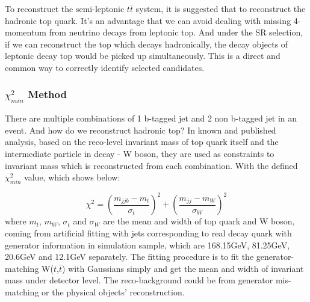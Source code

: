 		To reconstruct the semi-leptonic $t\bar{t}$ system, it is suggested that to reconstruct the hadronic top quark. It's an advantage that we can avoid dealing with missing 4-momentum from neutrino decays from leptonic top. And under the SR selection, if we can reconstruct the top which decays hadronically, the decay objects of leptonic decay top would be picked up simultaneously. This is a direct and common way to correctly identify selected candidates.

		\subsubsection{$\chi^2_{min}$ Method}
		\label{sssec:minchi2_intro} 

			There are multiple combinations of 1 b-tagged jet and 2 non b-tagged jet in an event. And how do we reconstruct hadronic top? In known and published analysis, based on the reco-level invariant mass of top quark itself and the intermediate particle in decay - W boson, they are used as constraints to invariant mass which is reconstructed from each combination. With the defined $\chi^2_{min}$ value, which shows below:

			\begin{equation}
			\chi^2 = (\frac{m_{jjb}-m_{t}}{\sigma_{t}})^2 + (\frac{m_{jj}-m_{W}}{\sigma_{W}})^2
			\label{eq:chi2}
			\end{equation}
			where $m_{t}$, $m_{W}$, $\sigma_{t}$ and $\sigma_{W}$ are the mean and width of top quark and W boson, coming from artificial fitting with jets corresponding to real decay quark with generator information in simulation sample, which are 168.15GeV, 81.25GeV, 20.6GeV and 12.1GeV separately. The fitting procedure is to fit the generator-matching W($t$,$\bar{t}$) with Gaussians simply and get the mean and width of invariant mass under detector level. The reco-background could be from generator mis-matching or the physical objects' reconstruction.

